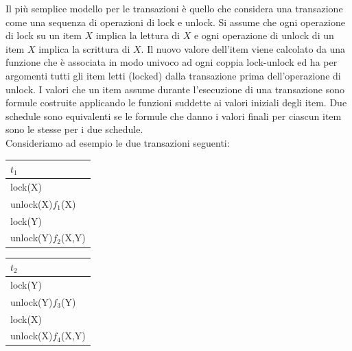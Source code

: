 Il più semplice modello per le transazioni è quello che considera una transazione come una
sequenza di operazioni di lock e unlock. Si assume che ogni operazione di lock su un item $X$ implica
la lettura di $X$ e ogni operazione di unlock di un item $X$ implica la scrittura di $X$. Il nuovo valore
dell'item viene calcolato da una funzione che è associata in modo univoco ad ogni coppia lock-unlock
ed ha per argomenti tutti gli item letti (locked) dalla transazione prima dell'operazione di
unlock. I valori che un item assume durante l'esecuzione di una transazione sono formule costruite
applicando le funzioni suddette ai valori iniziali degli item. Due schedule sono equivalenti se le
formule che danno i valori finali per ciascun item sono le stesse per i due schedule.\\
Consideriamo ad esempio le due transazioni seguenti:

\begin{multicols}{2}  

 \begin{tabular}{|l|}
   \hline
   $t_1$\\
   \hline
   lock(X)\\ 
   unlock(X)$f_1$(X)\\ 
   lock(Y)\\ 
   unlock(Y)$f_2$(X,Y)\\ 
  \hline
 \end{tabular}
 
 \begin{tabular}{|l|}
  \hline
   $t_2$\\
   \hline
   lock(Y)\\
   unlock(Y)$f_3$(Y)\\
   lock(X)\\
   unlock(X)$f_4$(X,Y)\\
  \hline
  \end{tabular} 
 \end{multicols}

